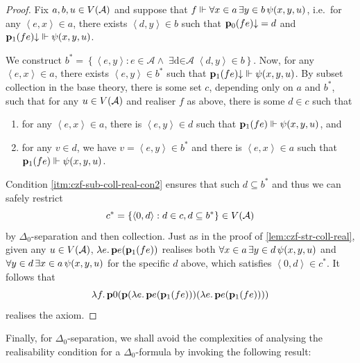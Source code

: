 \documentclass[12pt,openany]{book}
\theoremstyle{plain}
\theoremstyle{definition}
\newcommand\uplabel[1]{\textup{(#1)}}
\newcommand\tuple[1]{\left\langle #1 \right\rangle}
\newcommand\opA[1]{\mathop{\forall #1}}
\newcommand\opE[1]{\mathop{\exists #1}}
\newcommand\oplam[1]{\mathop{\lambda #1.}}
\newcommand\bp{\mathbf{p}}
\begin{document}
\begin{proof}
  Fix $a, b, u \in V\mleft(\mathcal{A}\mright)$ and suppose that $f \Vdash \opA{x \in a} \opE{y \in b} \psi\mleft(x, y, u\mright)$, i.e.\ for any $\tuple{e, x} \in a$, there exists $\tuple{d, y} \in b$ such that $\bp_0 \mleft(fe\mright) {\downarrow} = d$ and $\bp_1 \mleft(fe\mright) {\downarrow} \Vdash \psi\mleft(x, y, u\mright)$.

  We construct $b^* = \left\{\tuple{e, y} : e \in \mathcal{A} \land \opE{d \in \mathcal{A}} \tuple{d, y} \in b\right\}$. Now, for any $\tuple{e, x} \in a$, there exists $\tuple{e, y} \in b^*$ such that $\bp_1 \mleft(fe\mright) {\downarrow} \Vdash \psi\mleft(x, y, u\mright)$. By subset collection in the base theory, there is some set $c$, depending only on $a$ and $b^*$, such that for any $u \in V\mleft(\mathcal{A}\mright)$ and realiser $f$ as above, there is some $d \in c$ such that
  \begin{enumerate}[label=\uplabel{\roman*}]
    \item for any $\tuple{e, x} \in a$, there is $\tuple{e, y} \in d$ such that $\bp_1 \mleft(fe\mright) \Vdash \psi\mleft(x, y, u\mright)$, and
    \item \label{itm:czf-sub-coll-real-con2} for any $v \in d$, we have $v = \tuple{e, y} \in b^*$ and there is $\tuple{e, x} \in a$ such that $\bp_1 \mleft(fe\mright) \Vdash \psi\mleft(x, y, u\mright)$.
  \end{enumerate}
  Condition \ref{itm:czf-sub-coll-real-con2} ensures that such $d \subseteq b^*$ and thus we can safely restrict
  \[c^* = \left\{\tuple{0, d} : d \in c, d \subseteq b^*\right\} \in V\mleft(\mathcal{A}\mright)\]
  by $\Delta_0$-separation and then collection. Just as in the proof of \autoref{lem:czf-str-coll-real}, given any $u \in V\mleft(\mathcal{A}\mright)$, $\oplam{e} \bp e \mleft(\bp_1 \mleft(fe\mright)\mright)$ realises both $\opA{x \in a} \opE{y \in d} \psi\mleft(x, y, u\mright)$ and $\opA{y \in d} \opE{x \in a} \psi\mleft(x, y, u\mright)$ for the specific $d$ above, which satisfies $\tuple{0, d} \in c^*$. It follows that
  \[\oplam{f} \bp 0 \mleft(\bp \mleft(\oplam{e} \bp e \mleft(\bp_1 \mleft(fe\mright)\mright)\mright) \mleft(\oplam{e} \bp e \mleft(\bp_1 \mleft(fe\mright)\mright)\mright)\mright)\]
  realises the axiom.
\end{proof}

Finally, for $\Delta_0$-separation, we shall avoid the complexities of analysing the realisability condition for a $\Delta_0$-formula by invoking the following result:
\end{document}
